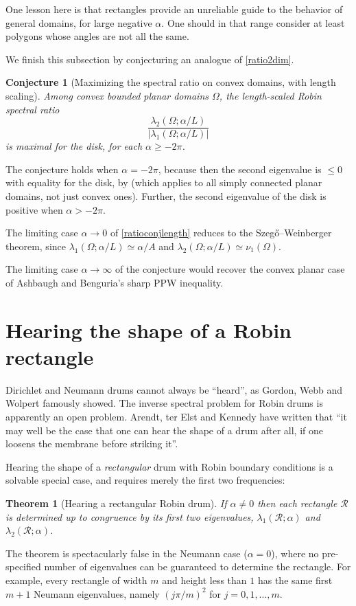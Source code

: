 \documentclass[12pt,reqno]{amsart}
\newtheorem{theorem}{Theorem}[section]
\newtheorem{conjx}{Conjecture}
\theoremstyle{definition}
\begin{document}
One lesson here is that rectangles provide an unreliable guide to the behavior of general domains, for large negative $\alpha$. One should in that range consider at least polygons whose angles are not all the same.  

We finish this subsection by conjecturing an analogue of \autoref{ratio2dim}. 
%
\begin{conjx}[Maximizing the spectral ratio on convex domains, with length scaling]\label{ratioconjlength} Among convex bounded planar domains $\Omega$, the length-scaled Robin spectral ratio 
\[
\frac{\lambda_2(\Omega;\alpha/L)}{|\lambda_1(\Omega;\alpha/L)|}
\]
is maximal for the disk, for each $\alpha \geq -2\pi$. 
\end{conjx}
%
The conjecture holds when $\alpha=-2\pi$, because then the second eigenvalue is $\leq 0$ with equality for the disk, by \cite[Theorem B]{FL18b} (which applies to all simply connected planar domains, not just convex ones). Further, the second eigenvalue of the disk is positive when $\alpha>-2\pi$. 

The limiting case $\alpha \to 0$ of \autoref{ratioconjlength} reduces to the Szeg\H{o}--Weinberger theorem, since $\lambda_1(\Omega;\alpha/L) \simeq \alpha/A$ and $\lambda_2(\Omega;\alpha/L) \simeq \nu_1(\Omega)$. 

The limiting case $\alpha \to \infty$ of the conjecture would recover the convex planar case of  Ashbaugh and Benguria's sharp PPW inequality. 


\section*{Hearing the shape of a Robin rectangle} Dirichlet and Neumann drums cannot always be ``heard'', as Gordon, Webb and Wolpert \cite{GWW92} famously showed. The inverse spectral problem for Robin drums is apparently an open problem. Arendt, ter Elst and Kennedy \cite{AEK14} have written that ``it may well be the case that one can hear the shape of a drum after all, if one loosens the membrane before striking it''.

Hearing the shape of a \emph{rectangular} drum with Robin boundary conditions is a solvable special case, and requires merely the first two frequencies:
%
\begin{theorem}[Hearing a rectangular Robin drum]\label{hearingdrum}
If $\alpha \neq 0$ then each rectangle $\mathcal{R}$ is determined up to congruence by its first two eigenvalues, $\lambda_1(\mathcal{R};\alpha)$ and $\lambda_2(\mathcal{R};\alpha)$.
\end{theorem}
%
The theorem is spectacularly false in the Neumann case ($\alpha = 0$), where no pre-specified number of eigenvalues can be guaranteed to determine the rectangle. For example, every rectangle of width $m$ and height less than $1$ has the same first $m+1$ Neumann eigenvalues, namely $(j\pi/m)^2$ for $j=0,1,\dots,m$. 
\end{document}
